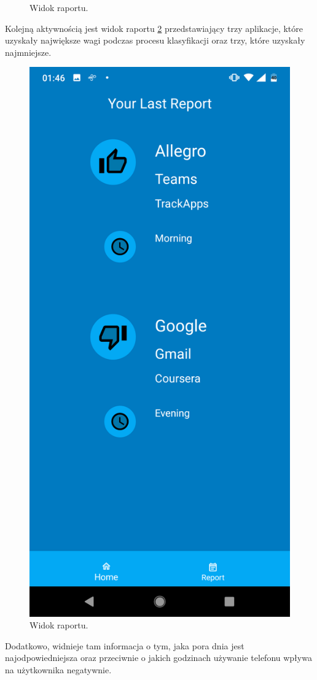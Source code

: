 \documentclass[a4paper,twoside,12pt]{book}
\begin{document}
\begin{description}
\begin{figure}[h!]
    \caption{Widok raportu.\protect\footnotemark}
    \label{fig:activites_history}
\end{figure}
Kolejną aktywnością jest widok raportu \ref{fig:report} przedstawiający trzy aplikacje, które uzyskały największe wagi podczas procesu klasyfikacji oraz trzy, które uzyskały najmniejsze. 
\begin{figure}[h!]
    \centering
    \includegraphics[scale=0.1]{images/report.png}
    \caption{Widok raportu.\protect\footnotemark}
    \label{fig:report}
\end{figure}
Dodatkowo, widnieje tam informacja o tym, jaka pora dnia jest najodpowiedniejsza oraz przeciwnie o jakich godzinach używanie telefonu wpływa na użytkownika negatywnie. 

\end{description}
\end{document}
